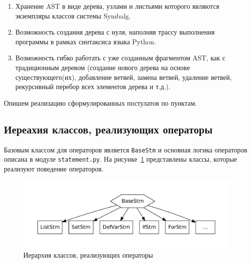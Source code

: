 \begin{enumerate}
    \item Хранение AST в виде дерева, узлами и листьями которого являются экземпляры классов системы {\sf Symbalg}.
    \item Возможность создания дерева с нуля, наполняя трассу выполнения программы в рамках синтаксиса языка {\sf Python}.
    \item Возможность гибко работать с уже созданным фрагментом AST, как с традиционным деревом (создание нового дерева на основе существующего(их), добавление ветвей, замена ветвей, удаление ветвей, рекурсивный перебор всех элементов дерева и т.д.).
\end{enumerate}

Опишем реализацию сформулированных постулатов по пунктам.

\subsection{Иереахия классов, реализующих операторы}

Базовым классом для операторов является \verb"BaseStm" и основная логика операторов описана в модуле \verb"statement.py". 
На рисунке~\ref{fig:hier} представлены классы, которые реализуют поведение операторов.

\begin{center}
    \begin{figure}
        \includegraphics[width=\textwidth]{images/Hier.pdf}
        \caption{Иерархия классов, реализующих операторы}
        \label{fig:hier}
    \end{figure}
\end{center}


